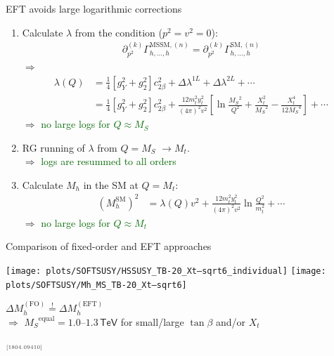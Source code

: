 \documentclass[hyperref={pdfpagelabels=false},ngerman]{beamer}
\newcommand{\eh}[1]{\,\mathsf{#1}}
\newcommand{\MS}{\ensuremath{M_S}}
\newcommand{\mycite}[1]{\ensuremath{\text{\textcolor{darkgray}{\tiny [#1]}}}}
\newcommand{\SM}{\ensuremath{\text{SM}}}
\newcommand{\MSSM}{\ensuremath{\text{MSSM}}}
\newcommand{\TeV}{\eh{TeV}}
\newcommand{\DMh}{\ensuremath{\Delta M_h^{(\text{FO})}}}
\newcommand{\DMhHSSUSY}{\ensuremath{\Delta M_h^{(\text{EFT})}}}
\begin{document}
\begin{frame}{EFT avoids large logarithmic corrections}
  \begin{enumerate}
  \item Calculate $\lambda$ from the condition ($p^2 = v^2 = 0$):
    \begin{align*}
      \partial_{p^2}^{(k)}\Gamma_{h,\ldots,h}^{\MSSM,(n)}
      = \partial_{p^2}^{(k)}\Gamma_{h,\ldots,h}^{\SM,(n)}
    \end{align*}
    $\Rightarrow$
    \begin{align*}
      \lambda(Q) &= \frac{1}{4}\left[g_Y^{2} + g_2^2\right] c^2_{2\beta}
                   + \Delta \lambda^{1L} + \Delta \lambda^{2L} + \cdots \\
                 &= \frac{1}{4}\left[g_Y^{2} + g_2^2\right] c^2_{2\beta}
      + \frac{12 m_t^2 y_t^2}{(4\pi)^2 v^2} \left[
        \ln\frac{\MS^2}{Q^2} + \frac{X_t^2}{\MS^2} - \frac{X_t^4}{12 \MS^4}
      \right]
      + \cdots
    \end{align*}
    $\Rightarrow$ \textcolor{darkgreen}{no large logs for $Q\approx\MS$}
  \item RG running of $\lambda$ from $Q = \MS$ $\rightarrow M_t$.\\
    $\Rightarrow$ \textcolor{darkgreen}{logs are resummed to all orders}
  \item Calculate $M_h$ in the SM at $Q = M_t$:
    \begin{align*}
      (M_h^\SM)^2 &= \lambda(Q) v^2 + \frac{12 m_t^2 y_t^2}{(4\pi)^2 v^2} \ln\frac{Q^2}{m_t^2} + \cdots
    \end{align*}
    $\Rightarrow$ \textcolor{darkgreen}{no large logs for $Q\approx M_t$}
  \end{enumerate}
\end{frame}

\begin{frame}{Comparison of fixed-order and EFT approaches}
  \begin{center}
    \texttt{[image: plots/SOFTSUSY/HSSUSY\_TB-20\_Xt--sqrt6\_individual]}\hfill
    \texttt{[image: plots/SOFTSUSY/Mh\_MS\_TB-20\_Xt--sqrt6]}
  \end{center}
  \begin{center}
    $\DMh \overset{!}{=} \DMhHSSUSY$\\[0.5em]
    $\Rightarrow$ $\MS^{\text{equal}} = 1.0$--$1.3\TeV$ for
    small/large $\tan\beta$ and/or $X_t$
  \end{center}
  \mycite{1804.09410}
\end{frame}
\end{document}
